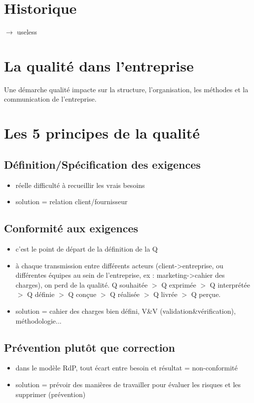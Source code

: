 	\section{Historique} 
		$\rightarrow$ useless
	
	\section{La qualité dans l'entreprise}
		Une démarche qualité impacte sur la structure, l'organisation, les méthodes et la communication de l'entreprise. 
	
	\section{Les 5 principes de la qualité}
		\subsection{Définition/Spécification des exigences}
			\begin{itemize}
			\item réelle difficulté à recueillir les vrais besoins
			\item solution = relation client/fournisseur
			\end{itemize}
		\subsection{Conformité aux exigences}
			\begin{itemize}
			\item c’est le point de départ de la définition de la Q
			\item à chaque transmission entre différents acteurs (client->entreprise, ou différentes équipes au sein de l’entreprise, ex : marketing->cahier des charges), on perd de la qualité. 
			Q souhaitée $>$ Q exprimée $>$ Q interprétée $>$ Q définie $>$ Q conçue $>$ Q réalisée $>$ Q livrée $>$ Q perçue. 
			\item solution = cahier des charges bien défini, V\&V (validation\&vérification), méthodologie...
			\end{itemize}
		\subsection{Prévention plutôt que correction}
			\begin{itemize}
			\item dans le modèle RdP, tout écart entre besoin et résultat = non-conformité
			\item solution = prévoir des manières de travailler pour évaluer les risques et les supprimer (prévention)
			\end{itemize}
